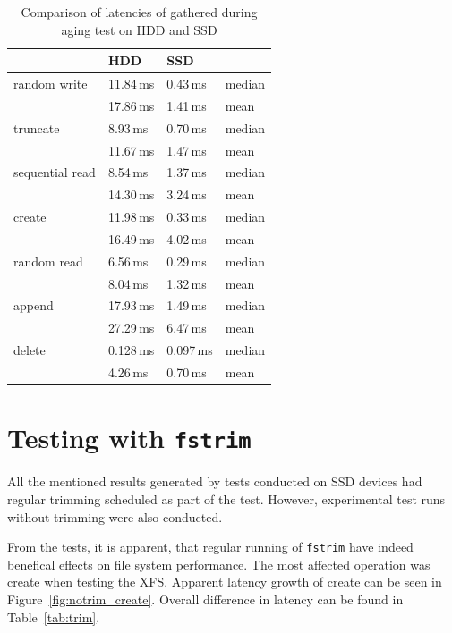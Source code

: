 \documentclass[
  color, %
  table, %
  lof,   %
  lot,   %
]{fithesis3}
\begin{document}
\begin{table}
\centering
\begin{tabular}{|l|l|l|l|}
\hline
 &HDD & SSD &  \\
\hline
    random write & 11.84\,ms & 0.43\,ms & median \\
 \hline
                 & 17.86\,ms & 1.41\,ms & mean\\
    \hline
        truncate & 8.93\,ms & 0.70\,ms & median\\
    \hline
                 & 11.67\,ms & 1.47\,ms & mean \\
    \hline
           sequential read & 8.54\,ms & 1.37\,ms & median\\
    \hline
                 & 14.30\,ms & 3.24\,ms & mean \\
    \hline
          create & 11.98\,ms & 0.33\,ms & median\\
    \hline
                 & 16.49\,ms & 4.02\,ms & mean \\
    \hline
     random read & 6.56\,ms & 0.29\,ms & median\\
    \hline
                 & 8.04\,ms & 1.32\,ms & mean \\
    \hline
          append & 17.93\,ms & 1.49\,ms & median\\
    \hline
                 & 27.29\,ms & 6.47\,ms & mean \\
    \hline
          delete & 0.128\,ms & 0.097\,ms & median\\
    \hline
                & 4.26\,ms & 0.70\,ms & mean \\
    \hline
\end{tabular}
\caption{Comparison of latencies of gathered during aging test on HDD and SSD}
\label{tab:ssd_hdd_xfs}
\end{table}

\section{Testing with \texttt{fstrim}}
All the mentioned results generated by tests conducted on SSD devices had regular trimming scheduled as part of the test. However, experimental test runs without trimming were also conducted. 

From the tests, it is apparent, that regular running of \texttt{fstrim} have indeed benefical effects on file system performance. The most affected operation was create when testing the XFS. Apparent latency growth of create can be seen in Figure~\ref{fig:notrim_create}. Overall difference in latency can be found in Table~\ref{tab:trim}.
\end{document}
